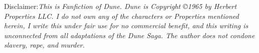 Disclaimer:\textit{This is Fanfiction of Dune. Dune is Copyright \copyright 1965 by Herbert Properties LLC.
I do not own any of the characters or Properties mentioned herein, I write this under fair use for no commercial benefit, and this writing is unconnected from all adaptations of the Dune Saga.
The author does not condone slavery, rape, and murder.}
